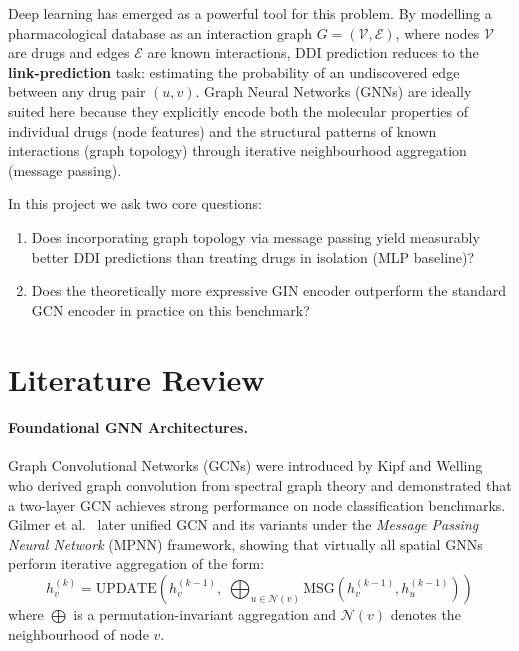\documentclass[11pt,a4paper]{article}
\begin{document}
Deep learning has emerged as a powerful tool for this problem.
By modelling a pharmacological database as an interaction graph
$G = (\mathcal{V}, \mathcal{E})$, where nodes $\mathcal{V}$ are drugs
and edges $\mathcal{E}$ are known interactions, DDI prediction reduces
to the \textbf{link-prediction} task: estimating the probability of an
undiscovered edge between any drug pair $(u, v)$.
Graph Neural Networks (GNNs) are ideally suited here because they
explicitly encode both the molecular properties of individual drugs (node
features) and the structural patterns of known interactions (graph
topology) through iterative neighbourhood aggregation (message passing).

In this project we ask two core questions:
\begin{enumerate}[leftmargin=*,noitemsep]
  \item Does incorporating graph topology via message passing yield
        measurably better DDI predictions than treating drugs in
        isolation (MLP baseline)?
  \item Does the theoretically more expressive GIN encoder outperform
        the standard GCN encoder in practice on this benchmark?
\end{enumerate}

\section{Literature Review}

\paragraph{Foundational GNN Architectures.}
Graph Convolutional Networks (GCNs) were introduced by Kipf and
Welling~\cite{kipf2017} who derived graph convolution from spectral graph
theory and demonstrated that a two-layer GCN achieves strong performance
on node classification benchmarks.
Gilmer et al.~\cite{gilmer2017} later unified GCN and its variants under
the \emph{Message Passing Neural Network} (MPNN) framework, showing that
virtually all spatial GNNs perform iterative aggregation of the form:
\begin{equation}
  h_v^{(k)} = \text{UPDATE}\!\left(h_v^{(k-1)},\;
    \bigoplus_{u \in \mathcal{N}(v)} \text{MSG}\!\left(h_v^{(k-1)}, h_u^{(k-1)}\right)\right)
\end{equation}
where $\bigoplus$ is a permutation-invariant aggregation and
$\mathcal{N}(v)$ denotes the neighbourhood of node $v$.
\end{document}
